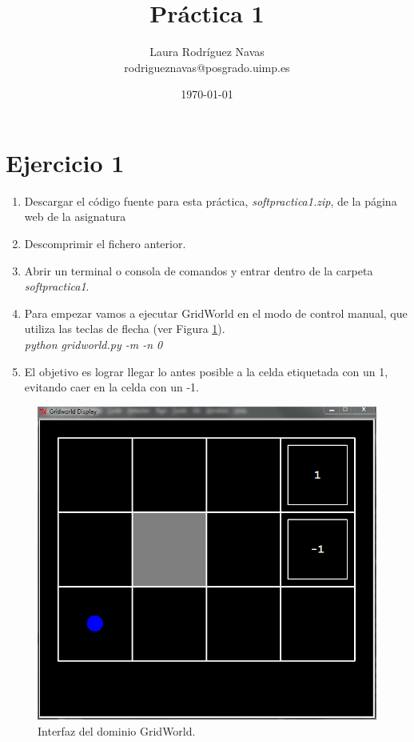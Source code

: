 \documentclass[11pt]{exam}
\title{Práctica 1}
\author{Laura Rodríguez Navas \\ rodrigueznavas@posgrado.uimp.es}
\date{{\selectlanguage{spanish}\today} }
\begin{document}
	
\maketitle

\section*{Ejercicio 1}

\begin{enumerate}
	\item Descargar el código fuente para esta práctica, \textit{softpractica1.zip}, de la página web de la asignatura
	\item Descomprimir el fichero anterior.
	\item Abrir un terminal o consola de comandos y entrar dentro de la carpeta \textit{softpractica1}.
	\item Para empezar vamos a ejecutar GridWorld en el modo de control manual, que utiliza las teclas de flecha (ver Figura \ref{image_1}). \\ \textit{python gridworld.py -m -n 0}	
	\item El objetivo es lograr llegar lo antes posible a la celda etiquetada con un 1, evitando caer en la celda con un -1.
\end{enumerate}

\begin{figure}[h]
	\centering
	\includegraphics[scale=0.5]{image_1}
	\caption{Interfaz del dominio GridWorld.}
	\label{image_1}
\end{figure}
\end{document}
